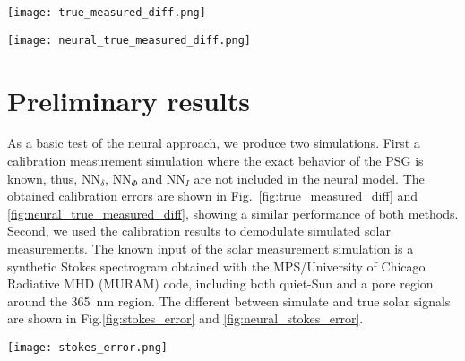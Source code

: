 \documentclass[baaa]{baaa}
\begin{document}
\begin{figure*}[!ht]
    \centering
    \texttt{[image: true\_measured\_diff.png]}
    \caption{True ($\text{S}_{true}$) and measured ($\text{S}_{meas}$) calibration Stokes parameters \emph{(see the panels titles)} for method (b), along with their difference \emph{(Diff., see the legend)}. For all quantities we plot the average over the image area for all the 40 calibration inputs (PSG position). Stokes Q, U and V are normalized with Stokes I and Stokes I is normalized to its value for the first calibration input.}
    \label{fig:true_measured_diff}
\end{figure*}

\begin{figure*}[!ht]
    \centering
    \texttt{[image: neural\_true\_measured\_diff.png]}
    \caption{Same as Fig.~\ref{fig:true_measured_diff} for the neural calibration method. Note that the difference is larger than for method (b), however is well below the $1\times10^{-3}$ achieved in real cases.}
    \label{fig:neural_true_measured_diff}
\end{figure*}

\section{Preliminary results}
As a basic test of the neural approach, we produce two simulations. First a calibration measurement simulation where the exact behavior of the PSG is known, thus, $\text{NN}_\delta$, $\text{NN}_\Phi$ and $\text{NN}_I$ are not included in the neural model. The obtained calibration errors are shown in Fig.~\ref{fig:true_measured_diff} and  \ref{fig:neural_true_measured_diff}, showing a similar performance of both methods. Second, we used the calibration results to demodulate simulated solar measurements. The known input of the solar measurement simulation is a synthetic Stokes spectrogram obtained with the MPS/University of Chicago Radiative MHD ({\sc MURAM}) code, including both quiet-Sun and a pore region around the 365~nm region. The different between simulate and true solar signals are shown in  Fig.\ref{fig:stokes_error} and \ref{fig:neural_stokes_error}.



\begin{figure*}[!ht]
    \centering
    \texttt{[image: stokes\_error.png]}
    \caption{Difference between true and measured Stokes parameters \emph{(see horizontal axes label in each panel)} for the simulated solar measurement, versus Stokes signal level. These errors were obtained using calibration method (b).}
    \label{fig:stokes_error}
\end{figure*}
\end{document}
